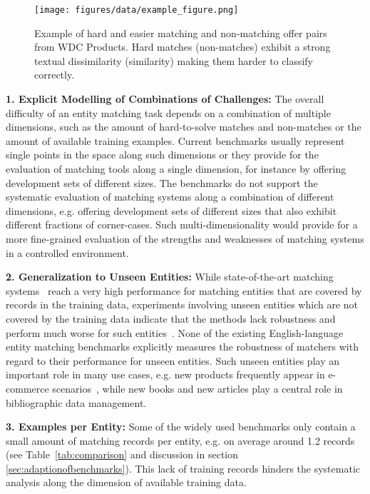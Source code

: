 \documentclass[sigconf,edbt]{acmart-edbt2024}
\begin{document}
\begin{figure*}
  \centering
  \texttt{[image: figures/data/example\_figure.png]}
  \caption{Example of hard and easier matching and non-matching offer pairs from WDC Products. Hard matches (non-matches) exhibit a strong textual dissimilarity (similarity) making them harder to classify correctly.}
  \label{fig:example}
\end{figure*} 
\textbf{1. Explicit Modelling of Combinations of Challenges:} The overall difficulty of an entity  matching task depends on a combination of multiple dimensions, such as the amount of hard-to-solve matches and non-matches or the amount of available training examples. Current benchmarks usually represent single points in the space along such dimensions or they provide for the evaluation of matching tools along a single dimension, for instance by offering development sets of different sizes. The benchmarks do not support the systematic evaluation of matching systems along a combination of different dimensions, e.g. offering development sets of different sizes that also exhibit different fractions of corner-cases. Such multi-dimensionality would provide for a more fine-grained evaluation of the strengths and weaknesses of matching systems in a controlled environment.

\textbf{2. Generalization to Unseen Entities:} While state-of-the-art matching systems~\cite{liDeepEntityMatching2020,yaoEntityResolutionHierarchical2022} reach a very high performance for matching entities that are covered by records in the training data, experiments involving unseen entities which are not covered by the training data indicate that the methods lack robustness and perform much worse for such entities~\cite{wangBridgingGapReality2022a,peetersDualobjectiveFinetuningBERT2021}. None of the existing English-language entity matching benchmarks explicitly measures the robustness of matchers with regard to their performance for unseen entities.
Such unseen entities play an important role in many use cases, e.g. new products frequently appear in e-commerce scenarios~\cite{wangBridgingGapReality2022a}, while new books and new articles play a central role in bibliographic data management. 

\textbf{3. Examples per Entity:} Some of the widely used benchmarks only contain a small amount of matching records per entity, e.g. on average around 1.2 records (see Table~\ref{tab:comparison} and discussion in section \ref{sec:adaptionofbenchmarks}). This lack of training records hinders the systematic analysis along the dimension of available training data.
\end{document}
